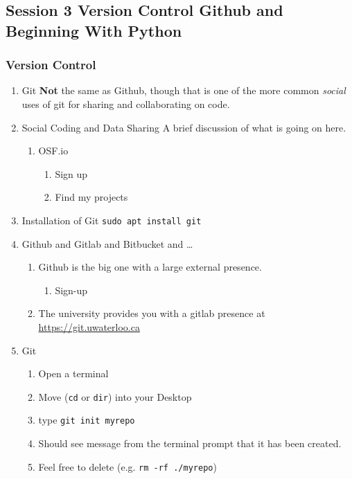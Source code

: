 \documentclass{article}
\begin{document}
\subsection{Session 3 Version Control Github and Beginning With Python}
\label{sec:org3c89647}
\subsubsection{Version Control}
\label{sec:org325e6c6}
\begin{enumerate}
\item Git
\label{sec:orgd15c8e0}
\textbf{\textbf{Not}} the same as Github, though that is one of the more common \emph{social} uses of git for sharing and collaborating on code. 
\item Social Coding and Data Sharing
\label{sec:orgf7c6d0f}
A brief discussion of what is going on here.
\begin{enumerate}
\item OSF.io
\label{sec:org1cd5446}
\begin{enumerate}
\item Sign up
\item Find my projects
\end{enumerate}
\end{enumerate}
\item Installation of Git
\label{sec:orgdc16590}
\texttt{sudo apt install git}
\item Github and Gitlab and Bitbucket and \ldots{}
\label{sec:org5f36a6d}
\begin{enumerate}
\item Github is the big one with a large external presence.
\begin{enumerate}
\item Sign-up
\end{enumerate}
\item The university provides you with a gitlab presence at \url{https://git.uwaterloo.ca}
\end{enumerate}
\item Git
\label{sec:org87f076a}
\begin{enumerate}
\item Open a terminal
\item Move (\texttt{cd} or \texttt{dir}) into your Desktop
\item type \texttt{git init myrepo}
\item Should see message from the terminal prompt that it has been created.
\item Feel free to delete (e.g. \texttt{rm -rf ./myrepo})

\end{enumerate}
\end{enumerate}
\end{document}
